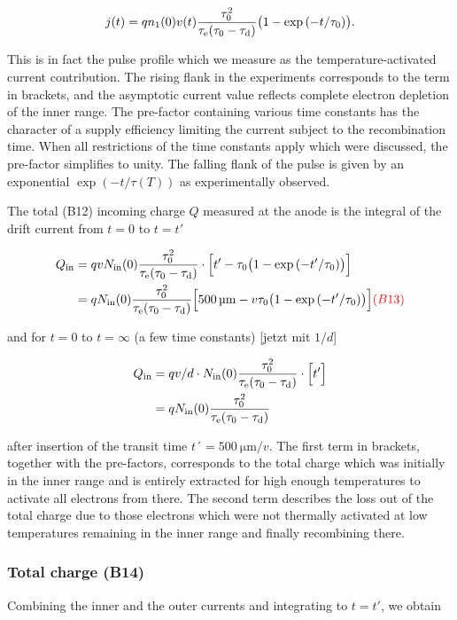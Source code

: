 \begin{equation}
 j(t) =  \mathnormal{q} n_1(0)v(t) \frac{\tau_{0}^2}{\tau_\textrm{e}(\tau_{0}-\tau_{\textrm{d}})} \big( 1- \exp{(-t/\tau_{0})}\big).
\end{equation}

This is in fact the pulse profile which we measure as the temperature-activated current contribution. 
The rising flank in the experiments corresponds to the term in brackets, and the asymptotic current value reflects complete electron depletion of the inner range. 
The pre-factor containing various time constants has the character of a supply efficiency limiting the current subject to the recombination time. 
When all restrictions of the time constants apply which were discussed, the pre-factor simplifies to unity. 
The falling flank of the pulse is given by an exponential $\exp(-t/\tau(T))$ as experimentally observed.

The total {\color{red}(B12)} incoming charge $Q$ measured at the anode is the integral of the drift current from $t = 0$ to $t= t'$

\begin{align}
 \Qin &= \q v \Nin(0) \frac{\tauzero^2}{\tauevap(\tauzero-\taudrift)} \cdot \Big[ t' - \tauzero \big( 1- \exp{(-t'/\tauzero)}\big) \Big] \\
   &= \q \Nin(0) \frac{\tauzero^2}{\tauevap(\tauzero-\taudrift)} \Big[  \SI{500}{\um} - v\tauzero \big( 1- \exp{(-t'/\tauzero)}\big) \Big] {\color{red}(B13)}
\end{align}

\noindent
and for $t = 0$ to $t = \infty$ (a few time constants) [jetzt mit $1/d$]

\begin{align}
 Q_{\textrm{in}} &= \mathnormal{q} v/d \cdot N_{\textrm{in}}(0) \frac{\tau_{0}^2}{\tau_\textrm{e}(\tau_{0}-\tau_{\textrm{d}})} \cdot \Big[ t' \Big] \\
   &= \mathnormal{q} N_{\textrm{in}}(0) \frac{\tau_{0}^2}{\tau_\textrm{e}(\tau_{0}-\tau_{\textrm{d}})}
\end{align}

\noindent
after insertion of the transit time $t´ =  \SI{500}{\um/v}$.
The first term in brackets, together with the pre-factors,
 corresponds to the total charge which was initially in the inner range and is entirely extracted for high enough temperatures to activate all electrons from there. 
The second term describes the loss out of the total charge due to those electrons which were not thermally activated at low temperatures remaining in the inner range and finally recombining there. 

\subsubsection{Total charge {\color{red}(B14)}}
Combining the inner and the outer currents and integrating to $t = t'$, we obtain

